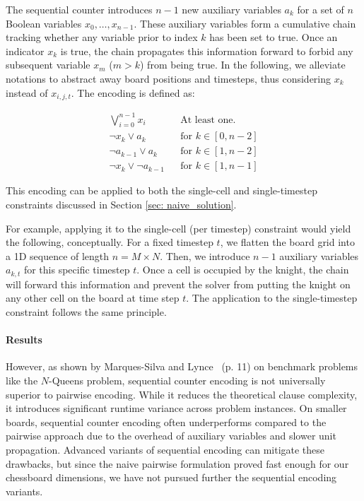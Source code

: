 \documentclass[a4paper, 11pt]{article}
\begin{document}
The sequential counter introduces $n-1$ new auxiliary variables $a_k$ for a set of $n$ Boolean variables $x_0, \dots, x_{n-1}$. These auxiliary variables form a cumulative chain tracking whether any variable prior to index $k$ has been set to true. Once an indicator $x_k$ is true, the chain propagates this information forward to forbid any subsequent variable $x_m$ ($m > k$) from being true. In the following, we alleviate notations to abstract away board positions and timesteps, thus considering $x_k$ instead of $x_{i, j, t}$. The encoding is defined as:

\begin{align}
    \bigvee_{i=0}^{n-1} x_i && \text{At least one.} \\
    \neg x_k \lor a_k && \text{for } k \in [0, n-2] \\
    \neg a_{k-1} \lor a_k && \text{for } k \in [1, n-2] \\
    \neg x_k \lor \neg a_{k-1} && \text{for } k \in [1, n-1]
\end{align}

This encoding can be applied to both the single-cell and single-timestep constraints discussed in Section \ref{sec: naive_solution}. 

For example, applying it to the single-cell (per timestep) constraint would yield the following, conceptually. For a fixed timestep $t$, we flatten the board grid into a 1D sequence of length $n = M \times N$. Then, we introduce $n - 1$ auxiliary variables $a_{k, t}$ for this specific timestep $t$. Once a cell is occupied by the knight, the chain will forward this information and prevent the solver from putting the knight on any other cell on the board at time step $t$. The application to the single-timestep constraint follows the same principle.

\paragraph{Results}
However, as shown by Marques-Silva and Lynce~\cite{MarquesSilvaLynce07} (p. 11) on benchmark problems like the $N$-Queens problem, sequential counter encoding is not universally superior to pairwise encoding. While it reduces the theoretical clause complexity, it introduces significant runtime variance across problem instances. On smaller boards, sequential counter encoding often underperforms compared to the pairwise approach due to the overhead of auxiliary variables and slower unit propagation. Advanced variants of sequential encoding can mitigate these drawbacks, but since the naive pairwise formulation proved fast enough for our chessboard dimensions, we have not pursued further the sequential encoding variants.
\end{document}
